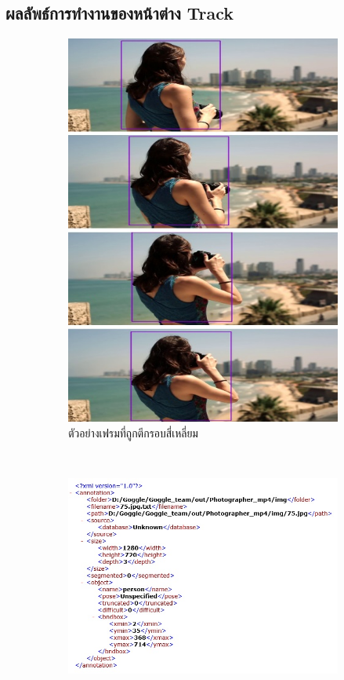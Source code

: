 \subsection*{ผลลัพธ์การทำงานของหน้าต่าง Track}
\begin{figure}[!ht]
    \centering
   \begin{subfigure}[b]{0.4\linewidth}
      \includegraphics[width=\linewidth]{chapter4/images/Result/result_select6.jpg}
      \caption{ตัวอย่างเฟรมที่ถูกตีกรอบสี่เหลี่ยม}
    \end{subfigure}
\\
    \begin{subfigure}[b]{0.7\linewidth}
      \includegraphics[width=\linewidth]{chapter4/images/Result/result_select7.jpg}

\end{subfigure}
\end{figure}

